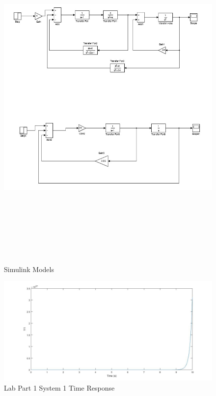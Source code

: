\documentclass[12pt]{article}
\begin{document}
\bigskip
\bigskip

\begin{figure}[h!] %
   \centering
   \includegraphics[width=\linewidth,height=7in]{simulink_models.jpg} 
   \caption{Simulink Models}
   \label{fig:example}
\end{figure}

\newpage

\begin{figure}[h!] %
   \centering
   \includegraphics[width=\linewidth]{time_response_system_1.jpg} 
   \caption{Lab Part 1 System 1 Time Response}
   \label{fig:example}
\end{figure}
\end{document}
